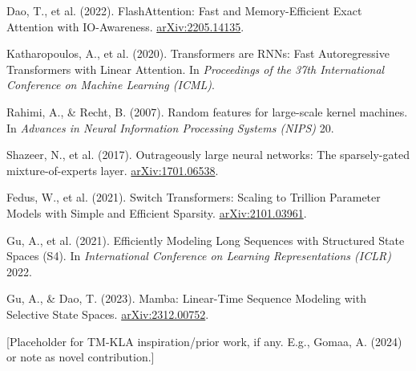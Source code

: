 \documentclass{article}
\begin{document}
\begin{thebibliography}{99} %

Dao, T., et al. (2022). FlashAttention: Fast and Memory-Efficient Exact Attention with IO-Awareness. \href{https://arxiv.org/abs/2205.14135}{arXiv:2205.14135}.

Katharopoulos, A., et al. (2020). Transformers are RNNs: Fast Autoregressive Transformers with Linear Attention. In \textit{Proceedings of the 37th International Conference on Machine Learning (ICML)}.

Rahimi, A., \& Recht, B. (2007). Random features for large-scale kernel machines. In \textit{Advances in Neural Information Processing Systems (NIPS)} 20.

Shazeer, N., et al. (2017). Outrageously large neural networks: The sparsely-gated mixture-of-experts layer. \href{https://arxiv.org/abs/1701.06538}{arXiv:1701.06538}.

Fedus, W., et al. (2021). Switch Transformers: Scaling to Trillion Parameter Models with Simple and Efficient Sparsity. \href{https://arxiv.org/abs/2101.03961}{arXiv:2101.03961}.

Gu, A., et al. (2021). Efficiently Modeling Long Sequences with Structured State Spaces (S4). In \textit{International Conference on Learning Representations (ICLR)} 2022.

Gu, A., \& Dao, T. (2023). Mamba: Linear-Time Sequence Modeling with Selective State Spaces. \href{https://arxiv.org/abs/2312.00752}{arXiv:2312.00752}.

[Placeholder for TM-KLA inspiration/prior work, if any. E.g., Gomaa, A. (2024) or note as novel contribution.]


\end{thebibliography}
\end{document}
